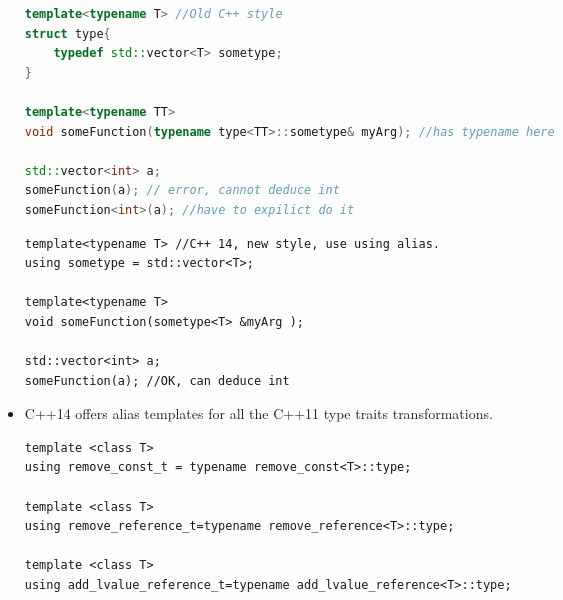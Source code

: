\documentclass[a4paper,11pt,twoside]{book}
\begin{document}
\begin{itemize}
\begin{lstlisting}[frame=single, language=c++]
template<typename T> //Old C++ style
struct type{ 
	typedef std::vector<T> sometype; 
}

template<typename TT>
void someFunction(typename type<TT>::sometype& myArg); //has typename here

std::vector<int> a;
someFunction(a); // error, cannot deduce int
someFunction<int>(a); //have to expilict do it 
\end{lstlisting}

\begin{lstlisting}[numbers=none]
template<typename T> //C++ 14, new style, use using alias.
using sometype = std::vector<T>;

template<typename T>
void someFunction(sometype<T> &myArg );

std::vector<int> a;
someFunction(a); //OK, can deduce int
\end{lstlisting}


\item C++14 offers alias templates for all the C++11 type traits transformations.
\begin{lstlisting}[numbers=none]
template <class T>
using remove_const_t = typename remove_const<T>::type;

template <class T>
using remove_reference_t=typename remove_reference<T>::type;

template <class T>
using add_lvalue_reference_t=typename add_lvalue_reference<T>::type;
\end{lstlisting}

\end{itemize}
\end{document}
